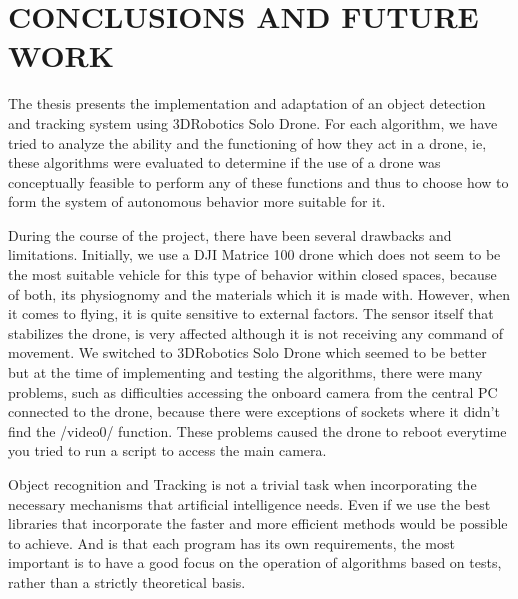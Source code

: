 %
%
%



\chapter{\uppercase{Conclusions and Future Work}}

The thesis presents the implementation and adaptation of an object detection and tracking system using 3DRobotics Solo Drone. For each algorithm, we have tried to analyze the ability and the functioning of how they act in a drone, ie, these algorithms were evaluated to determine if the use of a drone was conceptually feasible to perform any of these functions and thus to choose how to form the system of autonomous behavior more suitable for it.

During the course of the project, there have been several drawbacks and limitations. Initially, we use a DJI Matrice 100 drone which does not seem to be the most suitable vehicle for this type of behavior within closed spaces, because of both, its physiognomy and the materials  which it is made with. However, when it comes to flying, it is quite sensitive to external factors. The sensor itself that stabilizes the drone, is very affected although it is not receiving any command of movement. We switched to 3DRobotics Solo Drone which seemed to be better but at the time of implementing and testing the algorithms, there were many problems, such as difficulties accessing the onboard camera from the central PC connected to the drone, because there were exceptions of sockets where it didn't find the /video0/ function. These problems caused the drone to reboot everytime you tried to run a script to access the main camera.

Object recognition and Tracking is not a trivial task when incorporating the necessary mechanisms that artificial intelligence needs. Even if we use the best libraries that incorporate the faster and more efficient methods would be possible to achieve. And is that each program has its own requirements, the most important is to have a good focus on the operation of algorithms based on tests, rather than a strictly theoretical basis.

